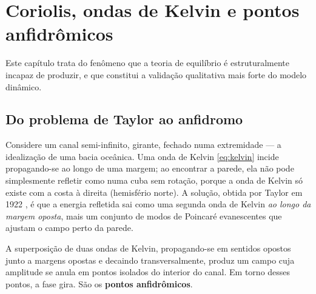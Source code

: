 \documentclass[11pt,a4paper,oneside]{report}
\theoremstyle{definition}
\theoremstyle{plain}
\theoremstyle{remark}
\begin{document}
\chapter{Coriolis, ondas de Kelvin e pontos anfidrômicos}
\label{cap:anfidromos}

Este capítulo trata do fenômeno que a teoria de equilíbrio é estruturalmente
incapaz de produzir, e que constitui a validação qualitativa mais forte do
modelo dinâmico.

\section{Do problema de Taylor ao anfidromo}

Considere um canal semi-infinito, girante, fechado numa extremidade — a
idealização de uma bacia oceânica. Uma onda de Kelvin \eqref{eq:kelvin} incide
propagando-se ao longo de uma margem; ao encontrar a parede, ela não pode
simplesmente refletir como numa cuba sem rotação, porque a onda de Kelvin só
existe com a costa à direita (hemisfério norte). A solução, obtida por Taylor
em 1922 \cite{taylor1922}, é que a energia refletida sai como uma segunda onda
de Kelvin \emph{ao longo da margem oposta}, mais um conjunto de modos de
Poincaré evanescentes que ajustam o campo perto da parede.

A superposição de duas ondas de Kelvin, propagando-se em sentidos opostos
junto a margens opostas e decaindo transversalmente, produz um campo cuja
amplitude se anula em pontos isolados do interior do canal. Em torno desses
pontos, a fase gira. São os \textbf{pontos anfidrômicos}.
\end{document}
